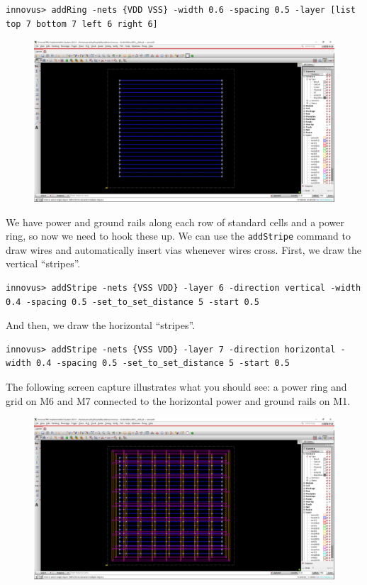 \documentclass[a4paper,12pt,twoside]{article}
\begin{document}
\begin{verbatim}
innovus> addRing -nets {VDD VSS} -width 0.6 -spacing 0.5 -layer [list top 7 bottom 7 left 6 right 6]
\end{verbatim}
\begin{figure}[H]
    \centering
    \includegraphics[width=\textwidth]{images/12.png}
\end{figure}
We have power and ground rails along each row of standard cells and a power ring, so now we need to hook these up. We can use the \texttt{addStripe} command to draw wires and automatically insert vias whenever wires cross. First, we draw the vertical “stripes”.
\begin{verbatim}
innovus> addStripe -nets {VSS VDD} -layer 6 -direction vertical -width 0.4 -spacing 0.5 -set_to_set_distance 5 -start 0.5
\end{verbatim}
And then, we draw the horizontal “stripes”.
\begin{verbatim}
innovus> addStripe -nets {VSS VDD} -layer 7 -direction horizontal -width 0.4 -spacing 0.5 -set_to_set_distance 5 -start 0.5
\end{verbatim}
The following screen capture illustrates what you should see: a power ring and grid on M6 and M7 connected to the horizontal power and ground rails on M1.
\begin{figure}[H]
    \centering
    \includegraphics[width=\textwidth]{images/13.png}
\end{figure}
\end{document}
